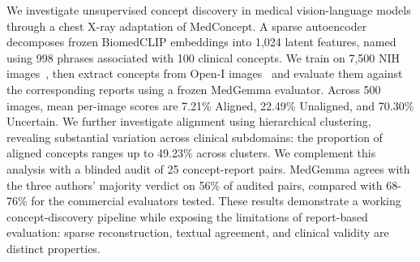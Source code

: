 We investigate unsupervised concept discovery in medical vision-language models through a chest X-ray adaptation of MedConcept. A sparse autoencoder decomposes frozen BiomedCLIP embeddings into 1,024 latent features, named using 998 phrases associated with 100 clinical concepts. We train on 7,500 NIH images~\cite{gronimo_nih10k}, then extract concepts from Open-I images~\cite{ykumards_openi} and evaluate them against the corresponding reports using a frozen MedGemma evaluator. Across 500 images, mean per-image scores are 7.21\% Aligned, 22.49\% Unaligned, and 70.30\% Uncertain. 
We further investigate alignment using hierarchical clustering, revealing substantial variation across clinical subdomains: the proportion of aligned concepts ranges up to 49.23\% across clusters. We complement this analysis with a blinded audit of 25 concept-report pairs.
MedGemma agrees with the three authors' majority verdict on 56\% of audited pairs, compared with 68-76\% for the commercial evaluators tested. These results demonstrate a working concept-discovery pipeline while exposing the limitations of report-based evaluation: sparse reconstruction, textual agreement, and clinical validity are distinct properties.
